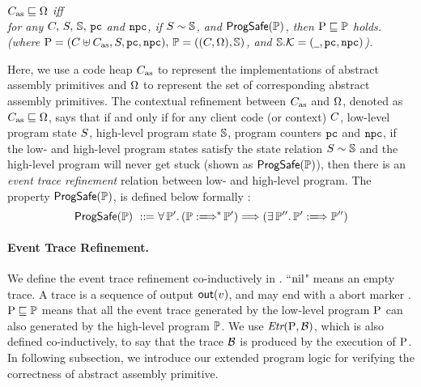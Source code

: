 \begin{definition}
    \em
    \label{def:prim-correctness}
    $C_{\text{as}} \sqsubseteq \Omega$ iff  \\
    for any $C, \, S, \, \mathbb{S}, \, \texttt{pc}$ and $\texttt{npc}$, if 
    ${S} \sim {\mathbb{S}}$, and $\textsf{ProgSafe}(\mathbb{P})$, 
    then $\text{P} \sqsubseteq \mathbb{P}$ holds. 
    (where $\text{P} = (C \uplus C_{\text{as}}, S, \texttt{pc}, \texttt{npc}), \, 
        \mathbb{P} = ((C, \Omega), \mathbb{S})$, and 
        $\mathbb{S}.\mathcal{K} = (\underline{\ \,}, \texttt{pc}, \texttt{npc})$).  
\end{definition}

Here, we use a code heap $C_{\text{as}}$
to represent the implementations of abstract 
assembly primitives and $\Omega$ to represent the set of corresponding 
abstract assembly primitives. The contextual refinement between 
$C_{\text{as}}$ and $\Omega$, denoted as $C_{\text{as}} \sqsubseteq \Omega$, 
says that if and only if for any client code 
(or context) $C$, low-level program 
state $S$, high-level program state $\mathbb{S}$, program counters 
$\texttt{pc}$ and $\texttt{npc}$, if the low- and high-level program states satisfy the 
state relation ${S} \sim {\mathbb{S}}$ and the high-level program 
will never get stuck (shown as $\textsf{ProgSafe}(\mathbb{P})$), 
then there is an {\it event trace refinement} relation 
between low- and high-level program. The property $\textsf{ProgSafe}(\mathbb{P})$, 
is defined below formally : 
\[
    \progsafe(\HProg) \ \define \ 
    \forall \, \HProg'. \, 
    (\HGlobMultiTrans{\HProg}{}{*}{\HProg'}) 
    \Longrightarrow 
    (\exists \, \HProg''. \, 
        \HGlobTrans{\HProg'}{}{\HProg''})
\]

\paragraph{\textbf{Event Trace Refinement.}}
We define the event trace refinement co-inductively 
in \Fig{\ref{fig:event-trace-refinement}}. ``$\text{nil}$" means 
an empty trace. A trace is a sequence of output $\textsf{out}({v})$, 
and may end with a abort marker \evtabort{}. 
$\text{P} \sqsubseteq \mathbb{P}$ means that all the event trace 
generated by the low-level program $\text{P}$ can also 
generated by the high-level program $\mathbb{P}$. 
We use $\textit{Etr}{(\text{P}, \mathcal{B})}$, which is also defined 
co-inductively, to say that the trace 
$\mathcal{B}$ is produced by the execution of $\text{P}$. 
In following subsection, we introduce our 
extended program logic for verifying the correctness 
of abstract assembly primitive. 

